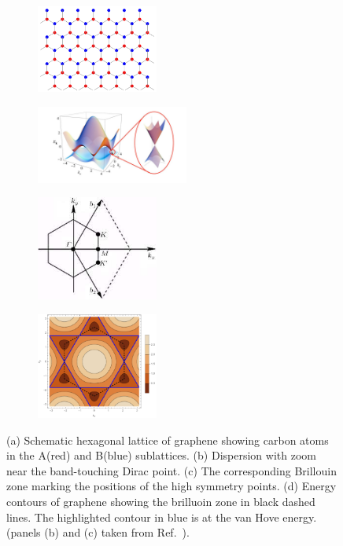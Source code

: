 \begin{figure}[]
	\centering
	\begin{subfigure}{0.5\linewidth}
		\centering
		\includegraphics[width=4cm]{figures/introduction/graphene lattice.png}
            \caption{\centering}
	\end{subfigure}%
        \begin{subfigure}{0.5\linewidth}
		\centering
		\includegraphics[width=5cm]{figures/introduction/bandstructure_graphene.png}
            \caption{\centering}
	\end{subfigure}%
	
 	\centering
	\begin{subfigure}{0.45\linewidth}
		\centering
		\includegraphics[width=4cm]{figures/introduction/brilluoinzonegraphene.png}
            \caption{\centering}
	\end{subfigure}
	\begin{subfigure}{0.45\linewidth}
		\centering
		\includegraphics[width=4cm]{figures/introduction/graphenecontours.pdf}
            \caption{\centering}
	\end{subfigure}

	\caption{(a) Schematic hexagonal lattice of graphene showing carbon atoms in the A(red) and B(blue) sublattices. (b) Dispersion with zoom near the band-touching Dirac point. (c) The corresponding Brillouin zone marking the positions of the high symmetry points. (d) Energy contours of graphene showing the brilluoin zone in black dashed lines. The highlighted contour in blue is at the van Hove energy. (panels (b) and (c) taken from Ref.~\cite{neto2009electronic}).}
	\label{fig:grapheneschematic}
\end{figure}

